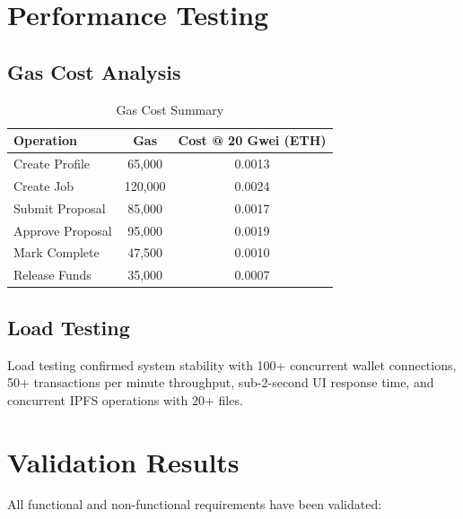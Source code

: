\section{Performance Testing}

\subsection{Gas Cost Analysis}

\begin{table}[H]
\centering
\caption{Gas Cost Summary}
\begin{tabular}{|l|c|c|}
\hline
\textbf{Operation} & \textbf{Gas} & \textbf{Cost @ 20 Gwei (ETH)} \\
\hline
Create Profile & 65,000 & 0.0013 \\
\hline
Create Job & 120,000 & 0.0024 \\
\hline
Submit Proposal & 85,000 & 0.0017 \\
\hline
Approve Proposal & 95,000 & 0.0019 \\
\hline
Mark Complete & 47,500 & 0.0010 \\
\hline
Release Funds & 35,000 & 0.0007 \\
\hline
\end{tabular}
\end{table}

\subsection{Load Testing}

Load testing confirmed system stability with 100+ concurrent wallet connections, 50+ transactions per minute throughput, sub-2-second UI response time, and concurrent IPFS operations with 20+ files.

\section{Validation Results}

All functional and non-functional requirements have been validated:

